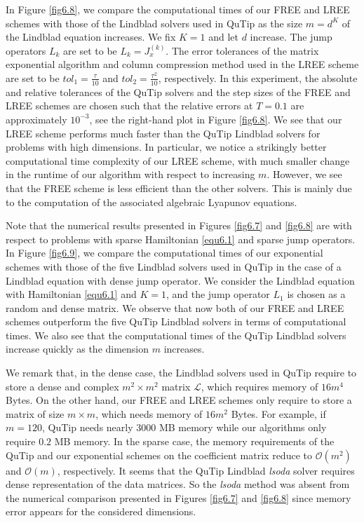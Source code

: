 \documentclass[preprint,3p,compress,12pt]{elsarticle}
\numberwithin{equation}{section}
\numberwithin{figure}{section}
\begin{document}
In Figure \ref{fig6.8}, we compare the computational times of our FREE and LREE schemes with those of the Lindblad solvers used in QuTip as the size $m=d^K$ of the Lindblad equation increases. We fix $K=1$ and let $d$ increase. The jump operators $L_k$ are set to be $L_k=J_x^{(k)}$. The error tolerances of the matrix exponential algorithm and column compression method used in the LREE scheme are set to be $tol_1=\frac{\tau}{10}$ and $tol_2=\frac{\tau^2}{10}$, respectively.
In this experiment, the absolute and relative tolerances of the QuTip solvers and the step sizes of the FREE and LREE schemes are chosen such that the relative errors at $T=0.1$ are approximately $10^{-3}$, see the right-hand plot in Figure \ref{fig6.8}. We see that our LREE scheme performs much faster than the QuTip Lindblad solvers for problems with high dimensions. In particular, we notice a strikingly better computational time complexity of our LREE scheme, with much smaller
change in the runtime of our algorithm with respect to increasing $m$. However, we see that the FREE scheme is less efficient than the other solvers. This is mainly due to the computation of the associated algebraic Lyapunov equations.

Note that the numerical results presented in Figures \ref{fig6.7} and \ref{fig6.8} are
with respect to problems with sparse Hamiltonian \eqref{equ6.1} and sparse jump operators. In Figure \ref{fig6.9}, we compare the computational times of our exponential schemes with those of the five Lindblad solvers used in QuTip in the case of a Lindblad equation with dense jump operator. We consider the Lindblad equation with Hamiltonian \eqref{equ6.1} and $K=1$, and the jump operator $L_1$ is chosen as a random and dense matrix. We observe that now both of our FREE and LREE schemes outperform the
five QuTip Lindblad solvers in terms of computational times. We also see that the computational times of the QuTip Lindblad solvers increase quickly as the dimension $m$ increases.

We remark that, in the dense case, the Lindblad solvers used in QuTip require to store a dense and complex $m^2 \times m^2$  matrix $\mathcal{L}$, which requires memory of $16m^4$ Bytes. On the other hand, our FREE and LREE schemes only require to store a matrix of size $m \times m$, which needs memory of $16m^2$ Bytes. For example, if $m=120$, QuTip needs nearly $3000$ MB memory while our algorithms only require $0.2$ MB memory. In the sparse case, the memory requirements of the QuTip and our exponential schemes on the coefficient matrix reduce to $\mathcal{O}(m^2)$ and $\mathcal{O}(m)$, respectively. It seems that the QuTip Lindblad \emph{lsoda} solver requires dense representation of the data matrices. So the \emph{lsoda} method was absent from the numerical comparison presented in Figures \ref{fig6.7} and \ref{fig6.8} since memory error appears for the considered dimensions.
\end{document}
